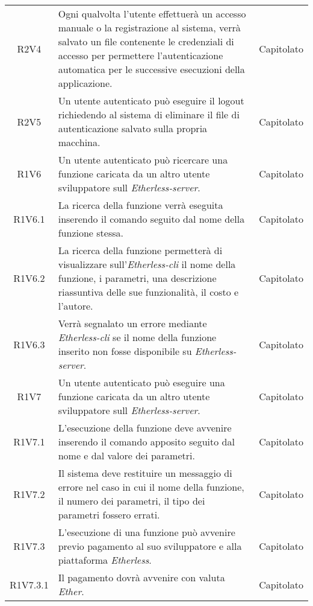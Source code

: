 \begin{longtable}{|c|p{8cm}|c|}
	R2V4 &  Ogni qualvolta l'utente effettuerà un accesso manuale o la registrazione al sistema, verrà salvato un file contenente le credenziali di accesso per permettere l'autenticazione automatica per le successive esecuzioni della applicazione.  & Capitolato \\
	
	R2V5 &  Un utente autenticato può eseguire il logout richiedendo al sistema di eliminare il file di autenticazione salvato sulla propria macchina.  & Capitolato \\
	
	R1V6 &  Un utente autenticato può ricercare una funzione caricata da un altro utente sviluppatore sull \textit{Etherless-server}.  & Capitolato \\
	
	R1V6.1 &  La ricerca della funzione verrà eseguita inserendo il comando seguito dal nome della funzione stessa.  & Capitolato \\
	
	R1V6.2 &  La ricerca della funzione permetterà di visualizzare sull'\textit{Etherless-cli} il nome della funzione, i parametri, una descrizione riassuntiva delle sue funzionalità, il costo e l'autore.  & Capitolato \\
	
	R1V6.3 &  Verrà segnalato un errore mediante \textit{Etherless-cli} se il nome della funzione inserito non fosse disponibile su \textit{Etherless-server}.  & Capitolato \\
	
	R1V7 &  Un utente autenticato può eseguire una funzione caricata da un altro utente sviluppatore sull \textit{Etherless-server}.  & Capitolato \\
	
	R1V7.1 &  L'esecuzione della funzione deve avvenire inserendo il comando apposito seguito dal nome e dal valore dei parametri.  & Capitolato \\

	R1V7.2 &  Il sistema deve restituire un messaggio di errore nel caso in cui il nome della funzione, il numero dei parametri, il tipo dei parametri fossero errati.  & Capitolato \\
	
	R1V7.3 &  L'esecuzione di una funzione può avvenire previo pagamento al suo sviluppatore e alla piattaforma \textit{Etherless}. & Capitolato \\
	
	R1V7.3.1 &  Il pagamento dovrà avvenire con valuta \textit{Ether\glos}. & Capitolato \\
	

\end{longtable}
